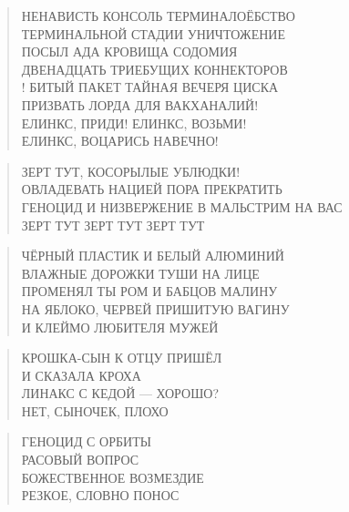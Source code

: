 \poemtitle{***}
\begin{verse}
НЕНАВИСТЬ КОНСОЛЬ ТЕРМИНАЛОЁБСТВО\\
ТЕРМИНАЛЬНОЙ СТАДИИ УНИЧТОЖЕНИЕ\\
ПОСЫЛ АДА КРОВИЩА СОДОМИЯ\\
ДВЕНАДЦАТЬ ТРИЕБУЩИХ КОННЕКТОРОВ\\!
БИТЫЙ ПАКЕТ ТАЙНАЯ ВЕЧЕРЯ ЦИСКА\\
ПРИЗВАТЬ ЛОРДА ДЛЯ ВАКХАНАЛИЙ!\\
ЕЛИНКС, ПРИДИ! ЕЛИНКС, ВОЗЬМИ!\\
ЕЛИНКС, ВОЦАРИСЬ НАВЕЧНО!
\end{verse}

\poemtitle{***}
\begin{verse}
ЗЕРТ ТУТ, КОСОРЫЛЫЕ УБЛЮДКИ! \\
ОВЛАДЕВАТЬ НАЦИЕЙ ПОРА ПРЕКРАТИТЬ\\
ГЕНОЦИД И НИЗВЕРЖЕНИЕ В МАЛЬСТРИМ НА ВАС\\
ЗЕРТ ТУТ ЗЕРТ ТУТ ЗЕРТ ТУТ
\end{verse}

\poemtitle{***}
\begin{verse}
ЧЁРНЫЙ ПЛАСТИК И БЕЛЫЙ АЛЮМИНИЙ\\
ВЛАЖНЫЕ ДОРОЖКИ ТУШИ НА ЛИЦЕ\\
ПРОМЕНЯЛ ТЫ РОМ И БАБЦОВ МАЛИНУ\\
НА ЯБЛОКО, ЧЕРВЕЙ ПРИШИТУЮ ВАГИНУ\\
И КЛЕЙМО ЛЮБИТЕЛЯ МУЖЕЙ
\end{verse}

\poemtitle{***}
\begin{verse}
КРОШКА-СЫН К ОТЦУ ПРИШЁЛ\\
И СКАЗАЛА КРОХА\\
ЛИНАКС С КЕДОЙ — ХОРОШО?\\
НЕТ, СЫНОЧЕК, ПЛОХО
\end{verse}

\poemtitle{***}
\begin{verse}
ГЕНОЦИД С ОРБИТЫ\\
РАСОВЫЙ ВОПРОС\\
БОЖЕСТВЕННОЕ ВОЗМЕЗДИЕ\\
РЕЗКОЕ, СЛОВНО ПОНОС
\end{verse}

